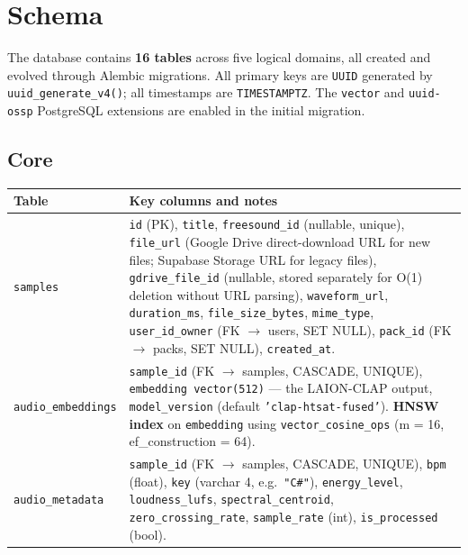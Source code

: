 \documentclass[12pt,letterpaper]{report}
\begin{document}
\chapter{Schema}

The database contains \textbf{16 tables} across five logical domains, all created and evolved through Alembic migrations. All primary keys are \texttt{UUID} generated by \texttt{uuid\_generate\_v4()}; all timestamps are \texttt{TIMESTAMPTZ}. The \texttt{vector} and \texttt{uuid-ossp} PostgreSQL extensions are enabled in the initial migration.

\section{Core}

\begin{center}
\begin{tabularx}{\textwidth}{lX}
\toprule
\textbf{Table} & \textbf{Key columns and notes} \\
\midrule
\texttt{samples}
  & \texttt{id} (PK), \texttt{title}, \texttt{freesound\_id} (nullable, unique),
    \texttt{file\_url} (Google Drive direct-download URL for new files; Supabase
    Storage URL for legacy files), \texttt{gdrive\_file\_id} (nullable,
    stored separately for O(1) deletion without URL parsing),
    \texttt{waveform\_url}, \texttt{duration\_ms}, \texttt{file\_size\_bytes},
    \texttt{mime\_type}, \texttt{user\_id\_owner} (FK $\to$ users, SET NULL),
    \texttt{pack\_id} (FK $\to$ packs, SET NULL), \texttt{created\_at}. \\
\addlinespace
\texttt{audio\_embeddings}
  & \texttt{sample\_id} (FK $\to$ samples, CASCADE, UNIQUE),
    \texttt{embedding vector(512)} --- the LAION-CLAP output,
    \texttt{model\_version} (default \texttt{'clap-htsat-fused'}).
    \textbf{HNSW index} on \texttt{embedding} using \texttt{vector\_cosine\_ops}
    (m = 16, ef\_construction = 64). \\
\addlinespace
\texttt{audio\_metadata}
  & \texttt{sample\_id} (FK $\to$ samples, CASCADE, UNIQUE),
    \texttt{bpm} (float), \texttt{key} (varchar 4, e.g.\ \texttt{"C\#"}),
    \texttt{energy\_level}, \texttt{loudness\_lufs}, \texttt{spectral\_centroid},
    \texttt{zero\_crossing\_rate}, \texttt{sample\_rate} (int),
    \texttt{is\_processed} (bool). \\
\bottomrule
\end{tabularx}
\end{center}
\end{document}
